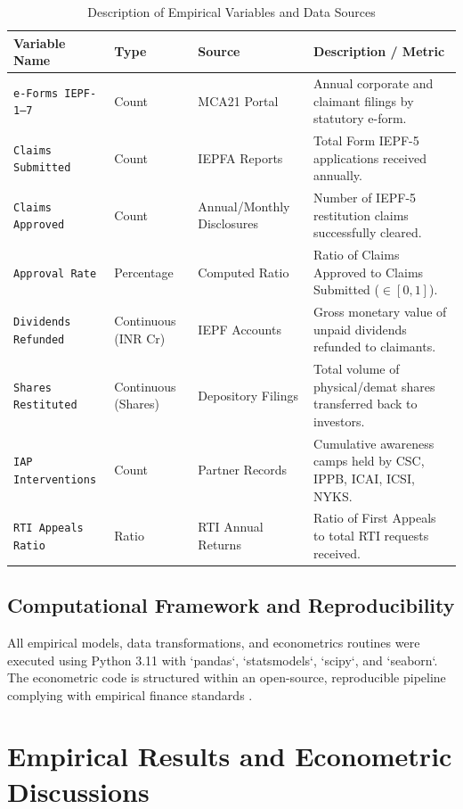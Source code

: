 \documentclass[openany]{book}
\begin{document}
\begin{table}[H]
\centering
\small
\begin{tabular}{|p{3.5cm}|p{2cm}|p{3cm}|p{6.5cm}|}
\hline
\textbf{Variable Name} & \textbf{Type} & \textbf{Source} & \textbf{Description / Metric} \\ \hline
\texttt{e-Forms IEPF-1--7} & Count & MCA21 Portal & Annual corporate and claimant filings by statutory e-form. \\ \hline
\texttt{Claims Submitted} & Count & IEPFA Reports & Total Form IEPF-5 applications received annually. \\ \hline
\texttt{Claims Approved} & Count & Annual/Monthly Disclosures & Number of IEPF-5 restitution claims successfully cleared. \\ \hline
\texttt{Approval Rate} & Percentage & Computed Ratio & Ratio of Claims Approved to Claims Submitted ($\in [0, 1]$). \\ \hline
\texttt{Dividends Refunded} & Continuous (INR Cr) & IEPF Accounts & Gross monetary value of unpaid dividends refunded to claimants. \\ \hline
\texttt{Shares Restituted} & Continuous (Shares) & Depository Filings & Total volume of physical/demat shares transferred back to investors. \\ \hline
\texttt{IAP Interventions} & Count & Partner Records & Cumulative awareness camps held by CSC, IPPB, ICAI, ICSI, NYKS. \\ \hline
\texttt{RTI Appeals Ratio} & Ratio & RTI Annual Returns & Ratio of First Appeals to total RTI requests received. \\ \hline
\end{tabular}
\caption{Description of Empirical Variables and Data Sources}
\label{tab:variables_summary}
\end{table}

\section{Computational Framework and Reproducibility}
All empirical models, data transformations, and econometrics routines were executed using Python 3.11 with `pandas`, `statsmodels`, `scipy`, and `seaborn`. The econometric code is structured within an open-source, reproducible pipeline complying with empirical finance standards \cite{angrist2009mostly}.


\chapter{Empirical Results and Econometric Discussions}
\end{document}

